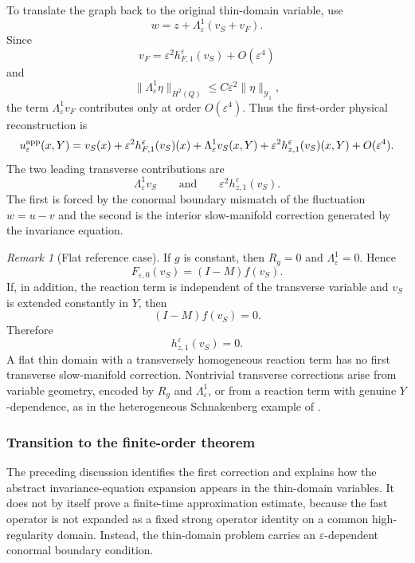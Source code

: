 \documentclass[11pt]{article}
\theoremstyle{definition}
\theoremstyle{remark}
\newtheorem{remark}[theorem]{Remark}
\numberwithin{equation}{section}
\begin{document}
To translate the graph back to the original thin-domain variable, use
\[
w=z+\Lambda_\varepsilon^1(v_S+v_F).
\]
Since
\[
v_F=\varepsilon^2h_{F,1}^\varepsilon(v_S)+O(\varepsilon^4)
\]
and
\[
\|\Lambda_\varepsilon^1\eta\|_{H^2(Q)}
\le
C\varepsilon^2\|\eta\|_{\mathcal Y_1},
\]
the term \(\Lambda_\varepsilon^1v_F\) contributes only at order
\(O(\varepsilon^4)\). Thus the first-order physical reconstruction is
\begin{equation}
\label{eq:thin-domain-first-reconstruction}
u_{\varepsilon}^{\rm app}(x,Y)
=
v_S(x)
+
\varepsilon^2h_{F,1}^\varepsilon(v_S)(x)
+
\Lambda_\varepsilon^1v_S(x,Y)
+
\varepsilon^2h_{z,1}^\varepsilon(v_S)(x,Y)
+
O(\varepsilon^4).
\end{equation}
The two leading transverse contributions are
\[
\Lambda_\varepsilon^1v_S
\qquad\text{and}\qquad
\varepsilon^2h_{z,1}^\varepsilon(v_S).
\]
The first is forced by the conormal boundary mismatch of the fluctuation
\(w=u-v\) and the second is the interior slow-manifold correction generated by the
invariance equation.

\begin{remark}[Flat reference case]
If \(g\) is constant, then \(R_g=0\) and \(\Lambda_\varepsilon^1=0\). Hence
\[
F_{\varepsilon,0}(v_S)
=
(I-M)f(v_S).
\]
If, in addition, the reaction term is independent of the transverse variable
and \(v_S\) is extended constantly in \(Y\), then
\[
(I-M)f(v_S)=0.
\]
Therefore
\[
h_{z,1}^\varepsilon(v_S)=0.
\]
A flat thin domain with a transversely homogeneous reaction term has no first
transverse slow-manifold correction. Nontrivial transverse corrections arise
from variable geometry, encoded by \(R_g\) and \(\Lambda_\varepsilon^1\), or
from a reaction term with genuine \(Y\)-dependence, as in the heterogeneous
Schnakenberg example of .
\end{remark}

\subsubsection*{Transition to the finite-order theorem}

The preceding discussion identifies the first correction and explains how the
abstract invariance-equation expansion appears in the thin-domain variables.
It does not by itself prove a finite-time approximation estimate, because the
fast operator is not expanded as a fixed strong operator identity on a common
high-regularity domain. Instead, the thin-domain problem carries an
\(\varepsilon\)-dependent conormal boundary condition.
\end{document}

